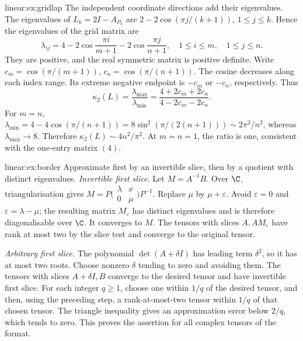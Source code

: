 \begin{solution}{linear:ex:gridlap}
\idea The independent coordinate directions add their eigenvalues.
\writeup The eigenvalues of $L_k=2I-A_{P_k}$ are $2-2\cos(\pi j/(k+1))$, $1\le j\le k$. Hence the eigenvalues of the grid matrix are
\[
\lambda_{ij}=4-2\cos\frac{\pi i}{m+1}-2\cos\frac{\pi j}{n+1},
\quad1\le i\le m,\quad1\le j\le n.
\]
They are positive, and the real symmetric matrix is positive definite. Write $c_m=\cos(\pi/(m+1))$, $c_n=\cos(\pi/(n+1))$. The cosine decreases along each index range. Its extreme negative endpoint is $-c_m$ or $-c_n$, respectively. Thus
\[
\kappa_2(L)=\frac{\lambda_{\max}}{\lambda_{\min}}
 =\frac{4+2c_m+2c_n}{4-2c_m-2c_n}.
\]
For $m=n$, $\lambda_{\min}=4-4\cos(\pi/(n+1))=8\sin^2(\pi/(2(n+1)))\sim2\pi^2/n^2$, whereas $\lambda_{\max}\to8$. Therefore $\kappa_2(L)\sim4n^2/\pi^2$. At $m=n=1$, the ratio is one, consistent with the one-entry matrix $(4)$.
\end{solution}

\begin{solution}{linear:ex:border}
\idea Approximate first by an invertible slice, then by a quotient with distinct eigenvalues.
\writeup \emph{Invertible first slice.} Let $M=A^{-1}B$. Over $\C$, triangularisation gives $M=P\bigl(\begin{smallmatrix}\lambda&x\\0&\mu\end{smallmatrix}\bigr)P^{-1}$. Replace $\mu$ by $\mu+\varepsilon$. Avoid $\varepsilon=0$ and $\varepsilon=\lambda-\mu$; the resulting matrix $M_\varepsilon$ has distinct eigenvalues and is therefore diagonalisable over $\C$. It converges to $M$. The tensors with slices $A,AM_\varepsilon$ have rank at most two by the slice test and converge to the original tensor.

\emph{Arbitrary first slice.} The polynomial $\det(A+\delta I)$ has leading term $\delta^2$, so it has at most two roots. Choose nonzero $\delta$ tending to zero and avoiding them. The tensors with slices $A+\delta I,B$ converge to the desired tensor and have invertible first slice. For each integer $q\ge1$, choose one within $1/q$ of the desired tensor, and then, using the preceding step, a rank-at-most-two tensor within $1/q$ of that chosen tensor. The triangle inequality gives an approximation error below $2/q$, which tends to zero. This proves the assertion for all complex tensors of the format.
\end{solution}

